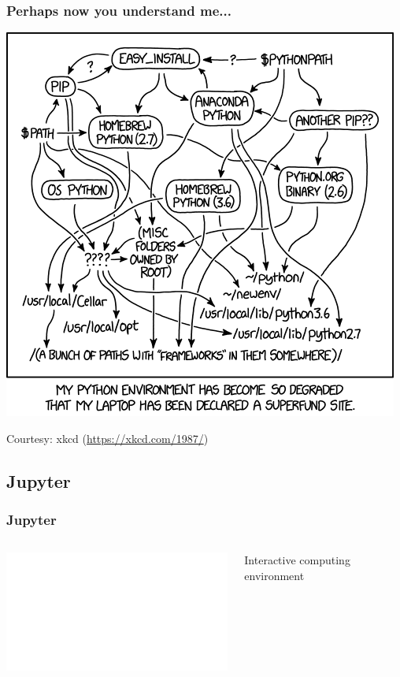 \documentclass[aspectratio=169]{beamer}
\begin{document}
\begin{frame}
    \frametitle{Perhaps now you understand me...}
    \centering
    \includegraphics[scale=0.35]{images/xkcd-python-env.png}

    {\small Courtesy: xkcd (\url{https://xkcd.com/1987/})}
\end{frame}

\subsection{Jupyter}

\begin{frame}
    \frametitle{Jupyter}
    \begin{columns}
        \begin{center}
            \includegraphics<2->[width=0.7\columnwidth]{images/jupyter-logo.pdf}
        \end{center}
        { {\LARGE Interactive computing environment}}
    \end{columns}
\end{frame}
\end{document}
